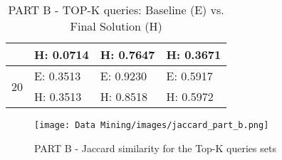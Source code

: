 \begin{table}[]
\begin{tabular}{l|lll|}
\multicolumn{1}{|l|}{}                    & \multicolumn{1}{l|}{H: 0.0714}    & \multicolumn{1}{l|}{H: 0.7647}  & H: 0.3671 \\ \hline
\multicolumn{1}{|l|}{\multirow{2}{*}{20}} & \multicolumn{1}{l|}{E: 0.3513} & \multicolumn{1}{l|}{E: 0.9230} & E: 0.5917 \\ \cline{2-4} 
\multicolumn{1}{|l|}{}                    & \multicolumn{1}{l|}{H: 0.3513} & \multicolumn{1}{l|}{H: 0.8518} & H: 0.5972 \\ \hline
\end{tabular}
\caption{PART B - TOP-K queries: Baseline (E) vs. Final Solution (H)}
\label{tab:jaccardB}
\end{table}

\begin{figure}[h!]
\centering
\texttt{[image: Data Mining/images/jaccard\_part\_b.png]}
\caption{PART B - Jaccard similarity for the Top-K queries sets}
\label{fig:jaccard-topk-partb}
\end{figure}



